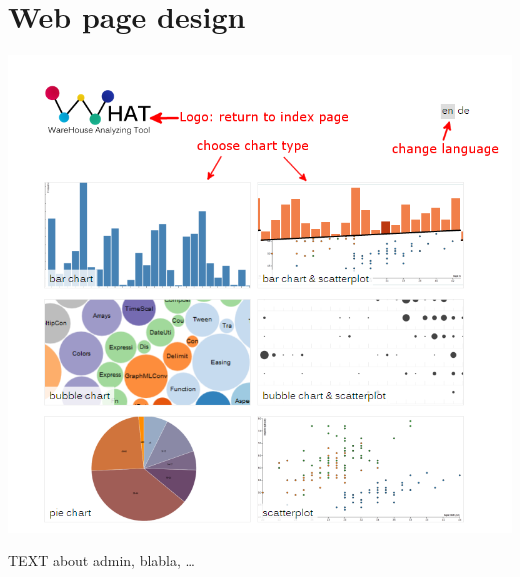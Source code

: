 \section{Web page design}


\begin{center}
\includegraphics[width=0.9\linewidth]{Pictures/WHATHome.png}
\end{center}   

TEXT about admin, blabla, \ldots